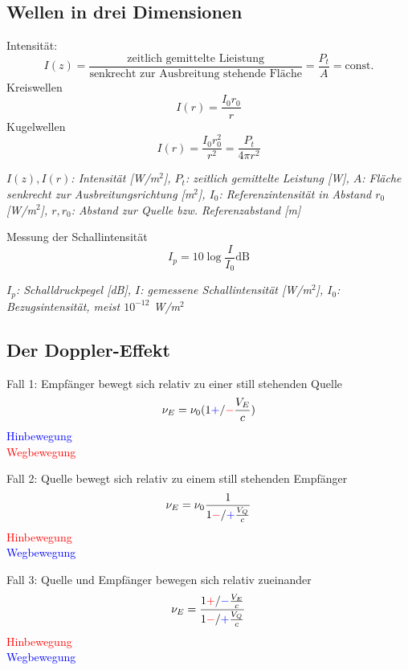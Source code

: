 \documentclass[a4paper,10pt]{article}
\newenvironment{displayformula}
{
	\begin{framed}
		\color{formulaColor}
	}
	{\end{framed}}
\newcommand{\formulalegend}[1]{%
	\par\vspace{0.5ex}%
	{{\color{legendColor}\RaggedRight\small\textit{#1}}}%
	\par\vspace{1.5ex}%
}
\begin{document}
\subsection{Wellen in drei Dimensionen}
\begin{displayformula}
	Intensität:
	\[
	I(z) = \frac{\text{zeitlich gemittelte Lieistung}}{\text{senkrecht zur Ausbreitung stehende Fläche}} = \frac{P_t}{A} = \text{const.}
	\]
	Kreiswellen
	\[
	I(r) = \frac{I_0r_0}{r}
	\]
	Kugelwellen
	\[
	I(r) = \frac{I_0r_0^2}{r^2} = \frac{P_t}{4\pi r^2}
	\]
\end{displayformula}
\formulalegend{
	\( I(z), I(r) \): Intensität [W/m\(^2\)], 
	\( P_t \): zeitlich gemittelte Leistung [W], 
	\( A \): Fläche senkrecht zur Ausbreitungsrichtung [m\(^2\)], 
	\( I_0 \): Referenzintensität in Abstand \( r_0 \) [W/m\(^2\)], 
	\( r, r_0 \): Abstand zur Quelle bzw. Referenzabstand [m]
}

\begin{displayformula}
	Messung der Schallintensität
	\[
	I_p = 10\log \frac{I}{I_0} \text{dB}
	\]
\end{displayformula}
\formulalegend{
	$I_p$: Schalldruckpegel [dB], 
	$I$: gemessene Schallintensität [W/m$^2$], 
	$I_0$: Bezugsintensität, meist $10^{-12}$ W/m$^2$
}



\subsection{Der Doppler-Effekt}

\begin{displayformula}
	Fall 1: Empfänger bewegt sich relativ zu einer still stehenden Quelle
	\[
	\nu_E = \nu_0 (1 \textcolor{blue}{+} / \textcolor{red}{-} \frac{V_E}{c})
	\]
	\textcolor{blue}{Hinbewegung} \\
	\textcolor{red}{Wegbewegung}
\end{displayformula}

\begin{displayformula}
	Fall 2: Quelle bewegt sich relativ zu einem still stehenden Empfänger
	\[
	\nu_E = \nu_0 \frac{1}{1 \textcolor{red}{-} / \textcolor{blue}{+} \frac{V_Q}{c}}
	\]
	\textcolor{red}{Hinbewegung} \\
	\textcolor{blue}{Wegbewegung}
\end{displayformula}

\begin{displayformula}
	Fall 3: Quelle und Empfänger bewegen sich relativ zueinander
	\[
	\nu_E = \frac{1 \textcolor{red}{+} / \textcolor{blue}{-} \frac{V_E}{c}}{1 \textcolor{red}{-} / \textcolor{blue}{+} \frac{V_Q}{c}}
	\]
	\textcolor{red}{Hinbewegung} \\
	\textcolor{blue}{Wegbewegung}
\end{displayformula}
\end{document}
